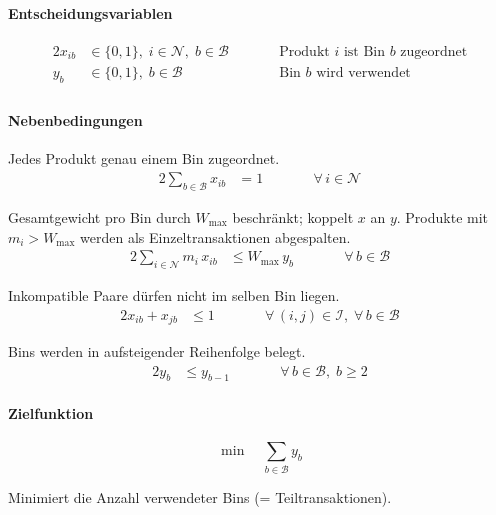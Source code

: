 \documentclass[10pt]{article}
\newcommand{\NN}{\mathcal{N}}
\newcommand{\BB}{\mathcal{B}}
\begin{document}
\paragraph{Entscheidungsvariablen}

\begin{alignat*}{2}
x_{ib} &\in \{0,1\},\; i \in \NN,\; b \in \BB
  &\qquad& \text{Produkt $i$ ist Bin $b$ zugeordnet} \\
y_b &\in \{0,1\},\; b \in \BB
  && \text{Bin $b$ wird verwendet} \\
\end{alignat*}

\paragraph{Nebenbedingungen}

Jedes Produkt genau einem Bin zugeordnet.
\begin{alignat*}{2}
\sum_{b \in \BB} x_{ib} &= 1
  &\qquad& \forall\, i \in \NN
\end{alignat*}

Gesamtgewicht pro Bin durch $W_{\max}$ beschr\"ankt; koppelt $x$ an $y$. Produkte mit $m_i > W_{\max}$ werden als Einzeltransaktionen abgespalten.
\begin{alignat*}{2}
\sum_{i \in \NN} m_i\, x_{ib} &\leq W_{\max}\, y_b
  &\qquad& \forall\, b \in \BB
\end{alignat*}

Inkompatible Paare d\"urfen nicht im selben Bin liegen.
\begin{alignat*}{2}
x_{ib} + x_{jb} &\leq 1
  &\qquad& \forall\, (i,j) \in \mathcal{I},\; \forall\, b \in \BB
\end{alignat*}

Bins werden in aufsteigender Reihenfolge belegt.
\begin{alignat*}{2}
y_b &\leq y_{b-1}
  &\qquad& \forall\, b \in \BB,\; b \geq 2
\end{alignat*}

\paragraph{Zielfunktion}

\begin{equation*}
\min \quad \sum_{b \in \BB} y_b
\end{equation*}

Minimiert die Anzahl verwendeter Bins (= Teiltransaktionen).

\end{document}
